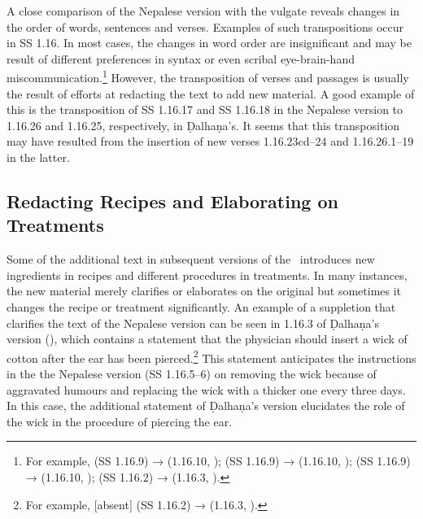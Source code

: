 A close comparison of the Nepalese version with the vulgate reveals changes in the 
order of words, sentences and verses. Examples of such transpositions occur in SS 1.16. 
In 
most cases, the changes in word order are insignificant and may be result of different 
preferences in syntax or even scribal eye-brain-hand miscommunication.\footnote{For 
example,  (SS 1.16.9) →  (1.16.10, \cite[77]{vulgate}); 
 (SS 1.16.9) →  (1.16.10, 
\cite[77]{vulgate});  (SS 1.16.9) → 
 (1.16.10, \cite[77]{vulgate}); 
(SS 1.16.2) →  (1.16.3, \cite[76]{vulgate}).} However, the transposition of verses and 
passages is usually the result of efforts at redacting the text to add new material. A good 
example of this is the transposition of SS 1.16.17 and SS 1.16.18 in the Nepalese version 
to 
1.16.26 and 1.16.25, respectively, in Ḍalhaṇa's. It seems that this transposition may have 
resulted from the insertion of new verses 1.16.23cd–24 and 1.16.26.1–19 in the latter.


%
\subsection{Redacting Recipes and Elaborating on Treatments}

Some of the additional text in subsequent versions of the \SS\ introduces new
ingredients in recipes and different procedures in treatments. In many instances,
the new material merely clarifies or elaborates on the original but sometimes it
changes the recipe or treatment significantly.  An example of a suppletion that
clarifies the text of the Nepalese version can be seen in 1.16.3 of Ḍalhaṇa's
version (\cite[76]{vulgate}), which contains a statement that the physician should
insert a wick\label{wick} of cotton after the ear has been pierced.\footnote{For 
example,
    [absent] (SS 1.16.2) →  (1.16.3, \cite[76]{vulgate}).}
    This statement anticipates the instructions in the the Nepalese version
    (SS 1.16.5–6) on removing the wick because of aggravated humours and replacing the
    wick with a thicker one every three days. In this case, the additional statement
    of Ḍalhaṇa's version elucidates the role of the wick in the procedure of piercing
    the ear.

